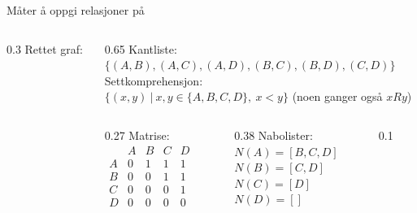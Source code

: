 \begin{frame}[fragile]{Måter å oppgi relasjoner på}
    \begin{columns}
        \begin{column}{0.3\textwidth}
            Rettet graf:

        \end{column}
        \begin{column}{0.65\textwidth}
            \pause
            Kantliste:\\
            $\{(A, B), (A, C), (A, D), (B, C), (B, D), (C, D)\}$\\[5mm]
            \pause
            Settkomprehensjon:\\
            $\{(x, y) ~ | ~ x, y \in \{A,B,C,D\}, ~ x < y\}$ (noen ganger også $xRy$)\\[5mm]
            \pause
            \begin{columns}
                \begin{column}{0.27\textwidth}
                    Matrise:\\
                    \begin{math}
                        \begin{matrix}
                              & A & B & C & D\\
                            A & 0 & 1 & 1 & 1\\
                            B & 0 & 0 & 1 & 1\\
                            C & 0 & 0 & 0 & 1\\
                            D & 0 & 0 & 0 & 0
                        \end{matrix}
                    \end{math}
                \end{column}
                \pause
                \begin{column}{0.38\textwidth}
                    Nabolister:\\        
                    $N(A) = [B, C, D]$\\
                    $N(B) = [C, D]$\\
                    $N(C) = [D]$\\
                    $N(D) = []$
                \end{column} 
                \begin{column}{0.1\textwidth}
                \end{column}
            \end{columns}
        \end{column}
    \end{columns}
\end{frame}




